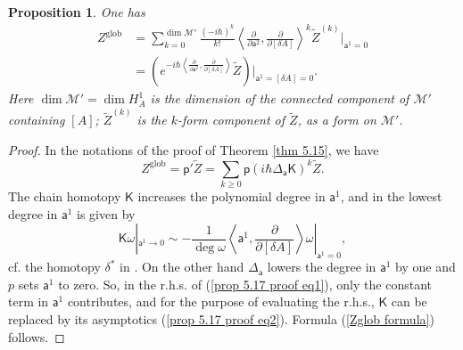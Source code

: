 \documentclass[11pt,a4paper]{amsart}
\theoremstyle{plain} %
\newtheorem{cor}[thm]{Corollary}
\newtheorem{prop}[thm]{Proposition}
\theoremstyle{definition}
\theoremstyle{remark}
\newcommand{\mr}{\mathrm}
\newcommand{\sfa}{\mathsf{a}}
\newcommand{\ra}{\rightarrow}
\newcommand{\M}{\mathcal{M}}
\newcommand{\til}{\widetilde}
\newcommand{\ul}{\underline}
\begin{document}
\begin{prop}\label{prop: Zglob formula}
    One has
    \begin{equation}\label{Zglob formula}
    \begin{aligned}
        Z^\mr{glob}&=\sum_{k=0}^{\dim \M'} \frac{(-i\hbar)^k}{k!} \left\langle \frac{\partial}{\partial \sfa^2},\frac{\partial}{\partial [\delta A]}\right\rangle^k \til{Z}^{(k)}\Big|_{\sfa^1=0}\\
        &=\left(e^{-i\hbar \left\langle \frac{\partial}{\partial \sfa^2},\frac{\partial}{\partial [\delta A]}\right\rangle} \til{Z} \right) \Big|_{\sfa^1=[\delta A]=0}
        .
        \end{aligned}
    \end{equation}
    Here $\dim \M'=\dim H^1_A$ is the dimension of the connected component of $\M'$ containing $[A]$; $\til{Z}^{(k)}$ is the $k$-form component of $\til{Z}$, as a form on $\M'$.
\end{prop}
\begin{proof}
In the notations of the proof of Theorem \ref{thm 5.15}, we have
\begin{equation}\label{prop 5.17 proof eq1}
    Z^\mr{glob}=\mathsf{p}'\til{Z}=\sum_{k\geq 0} \mathsf{p}(i\hbar\Delta_\sfa \mathsf{K})^k \til{Z}.
\end{equation}
The chain homotopy $\mathsf{K}$ increases the polynomial degree in $\sfa^1$, and in the lowest degree in $\sfa^1$ is given by 
\begin{equation}\label{prop 5.17 proof eq2}
    \mathsf{K}\omega|_{\sfa^1\ra 0}  \sim -\frac{1}{\deg\omega} \left\langle \sfa^1,\frac{\partial}{\partial [\delta A]}\right\rangle \omega|_{\sfa^1=0},
\end{equation}
cf. the homotopy $\delta^*$ in \cite[Section 2]{Bonechi2012}. On the other hand $\Delta_\sfa$ lowers the degree in $\sfa^1$ by one and $p$ sets $\sfa^1$ to zero. So, in the r.h.s. of (\ref{prop 5.17 proof eq1}), only the constant term in $\sfa^1$ contributes, and for the purpose of evaluating the r.h.s., $\mathsf{K}$ can be replaced by its asymptotics (\ref{prop 5.17 proof eq2}). Formula (\ref{Zglob formula}) follows.
\end{proof}

\end{document}

